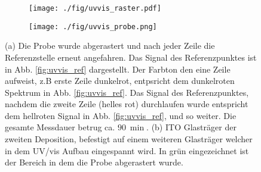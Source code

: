 \begin{figure}
    \begin{subfigure}[b]{0.65\textwidth}
      \texttt{[image: ./fig/uvvis\_raster.pdf]}
      \caption{}
      \label{fig:uvvis_raster}
    \end{subfigure}\hfill
    \begin{subfigure}[b]{0.325\textwidth}
      \texttt{[image: ./fig/uvvis\_probe.png]}
      \caption{}
      \label{fig:uvvis_probe}
    \end{subfigure}
    \caption{(a) Die Probe wurde abgerastert und nach jeder Zeile die Referenzstelle erneut angefahren. Das Signal des Referenzpunktes ist in Abb. \ref{fig:uvvis_ref} dargestellt. Der Farbton den eine Zeile aufweist, z.B erste Zeile dunkelrot, entpsricht dem dunkelroten Spektrum in Abb. \ref{fig:uvvis_ref}. Das Signal des Referenzpunktes, nachdem die zweite Zeile (helles rot) durchlaufen wurde entspricht dem hellroten Signal in Abb. \ref{fig:uvvis_ref}, und so weiter. Die gesamte Messdauer betrug ca. $\SI{90}{\min}$. (b) ITO Glasträger der zweiten Deposition, befestigt auf einem weiteren Glasträger welcher in dem UV/vis Aufbau eingespannt wird. In grün eingezeichnet ist der Bereich in dem die Probe abgerastert wurde.} 
    \label{fig:uvvis_ablauf}
\end{figure}

